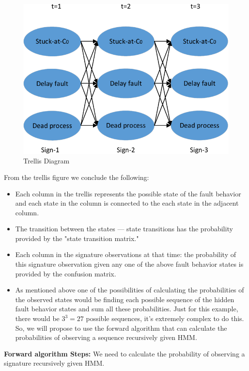 \begin{figure}[tb!]
 \centering
  \captionsetup{justification=centering}    
   \includegraphics[scale=0.8]{Figures/viterbi.pdf}
   \caption{Trellis Diagram}
\label{fig:trellis}
\end{figure}
From the trellis figure we conclude the following:
\begin{itemize}
\item Each column in the trellis represents the possible state of the fault behavior and each state in the column is connected to the each state in the adjacent column.
\item The transition between the states --- state transitions has the probability provided by the "state transition matrix."
\item Each column in the signature observations at that time: the probability of this signature observation given any one of the above fault behavior states is provided by the confusion matrix. 
\item As mentioned above one of the possibilities of calculating the probabilities of the observed states would be finding each possible sequence of the hidden fault behavior states and sum all these probabilities. Just for this example, there would be $3^3 = 27$ possible sequences, it’s extremely complex to do this. So, we will propose to use the forward algorithm that can calculate the probabilities of observing a sequence recursively given HMM.
\end{itemize}
\textbf{Forward algorithm Steps:}
We need to calculate the probability of observing a signature recursively given HMM. 
